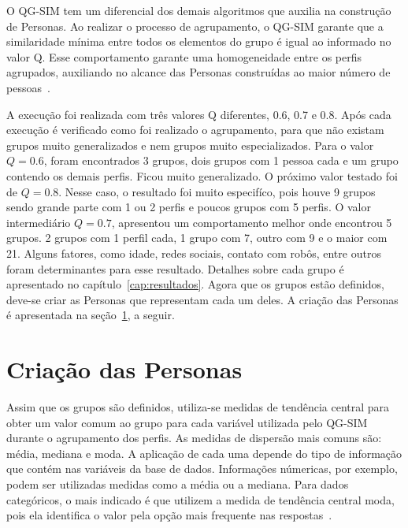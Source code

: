 O QG-SIM tem um diferencial dos demais algoritmos que auxilia na construção de Personas. Ao realizar o processo de agrupamento, o QG-SIM garante que a similaridade mínima entre todos os elementos do grupo é igual ao informado no valor Q. Esse comportamento garante uma homogeneidade entre os perfis agrupados, auxiliando no alcance das Personas construídas ao maior número de pessoas~\cite{masiero:2013}.

A execução foi realizada com três valores Q diferentes, 0.6, 0.7 e 0.8. Após cada execução é verificado como foi realizado o agrupamento, para que não existam grupos muito generalizados e nem grupos muito especializados. Para o valor $Q = 0.6$, foram encontrados 3 grupos, dois grupos com 1 pessoa cada e um grupo contendo os demais perfis. Ficou muito generalizado. O próximo valor testado foi de $Q = 0.8$. Nesse caso, o resultado foi muito especifíco, pois houve 9 grupos sendo grande parte com 1 ou 2 perfis e poucos grupos com 5 perfis. O valor intermediário $Q = 0.7$, apresentou um comportamento melhor onde encontrou 5 grupos. 2 grupos com 1 perfil cada, 1 grupo com 7, outro com 9 e o maior com 21. Alguns fatores, como idade, redes sociais, contato com robôs, entre outros foram determinantes para esse resultado. Detalhes sobre cada grupo é apresentado no capítulo~\ref{cap:resultados}. Agora que os grupos estão definidos, deve-se criar as Personas que representam cada um deles. A criação das Personas é apresentada na seção~\ref{sec:criacaopersonas}, a seguir.

\section{Criação das Personas}
\label{sec:criacaopersonas}
Assim que os grupos são definidos, utiliza-se medidas de tendência central para obter um valor comum ao grupo para cada variável utilizada pelo QG-SIM durante o agrupamento dos perfis. As medidas de dispersão mais comuns são: média, mediana e moda. A aplicação de cada uma depende do tipo de informação que contém nas variáveis da base de dados. Informações númericas, por exemplo, podem ser utilizadas medidas como a média ou a mediana. Para dados categóricos, o mais indicado é que utilizem a medida de tendência central moda, pois ela identifica o valor pela opção mais frequente nas respostas~\cite{masiero:2013}.


